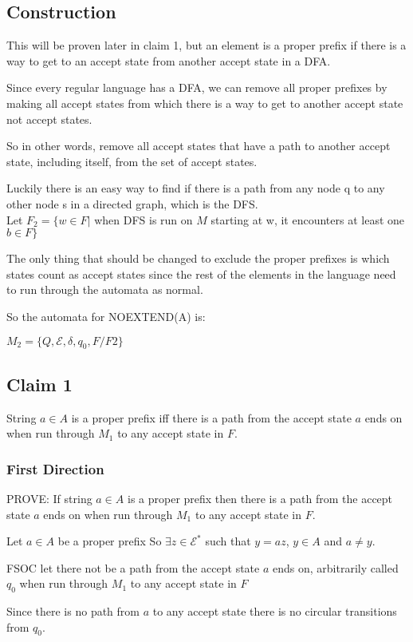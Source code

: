 \documentclass[letterpaper, 11pt]{article}
\begin{document}
\subsection*{Construction}
This will be proven later in claim 1, but an element is a proper prefix if there is a way to get to an accept state from another accept state in a DFA.

Since every regular language has a DFA, we can remove all proper prefixes by making all accept states from which there is a way to get to another accept state not accept states.

So in other words, remove all accept states that have a path to another accept state, including itself, from the set of accept states.

Luckily there is an easy way to find if there is a path from any node q to any other node s in a directed graph, which is the DFS.\\

Let $F_2 = \{w \in F|$ when DFS is run on $M$ starting at w, it encounters at least one $b \in F\}$

The only thing that should be changed to exclude the proper prefixes is which states count as accept states since the rest of the elements in the language need to run through the automata as normal.

So the automata for NOEXTEND(A) is:

$M_2 = \{Q, \mathcal{E}, \delta, q_0, F/F2\}$
\subsection*{Claim 1}
String $a \in A$ is a proper prefix iff there is a path from the accept state $a$ ends on when run through $M_1$ to any accept state in $F$.

\subsubsection*{First Direction}
PROVE: If string $a \in A$ is a proper prefix then there is a path from the accept state $a$ ends on when run through $M_1$ to any accept state in $F$.

Let $a \in A$ be a proper prefix
So $\exists z \in \mathcal{E}^*$ such that $y = az$, $y \in A$ and $a \neq y$.

FSOC let there not be a path from the accept state $a$ ends on, arbitrarily called $q_0$ when run through $M_1$ to any accept state in $F$

Since there is no path from $a$ to any accept state there is no circular transitions from $q_0$.
\end{document}
